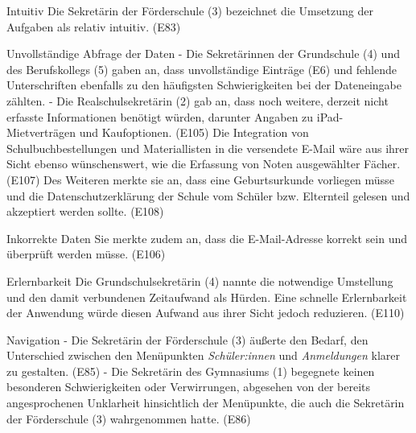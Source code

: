 Intuitiv
Die Sekretärin der Förderschule (3) bezeichnet die Umsetzung der Aufgaben als \glqq relativ intuitiv\grqq{}. (E83)

Unvollständige Abfrage der Daten
- Die Sekretärinnen der Grundschule (4) und des Berufskollegs (5) gaben an, dass unvollständige Einträge (E6) und fehlende Unterschriften ebenfalls zu den häufigsten Schwierigkeiten bei der Dateneingabe zählten.
- Die Realschulsekretärin (2) gab an, dass noch weitere, derzeit nicht erfasste Informationen benötigt würden, darunter Angaben zu iPad-Mietverträgen und Kaufoptionen. (E105)  Die Integration von Schulbuchbestellungen und Materiallisten in die versendete E-Mail wäre aus ihrer Sicht ebenso wünschenswert, wie die Erfassung von Noten ausgewählter Fächer. (E107) Des Weiteren merkte sie an, dass eine Geburtsurkunde vorliegen müsse und die Datenschutzerklärung der Schule vom Schüler bzw. Elternteil gelesen und akzeptiert werden sollte. (E108)

Inkorrekte Daten
Sie merkte zudem an, dass die E-Mail-Adresse korrekt sein und überprüft werden müsse. (E106)

Erlernbarkeit 
Die Grundschulsekretärin (4) nannte die notwendige Umstellung und den damit verbundenen Zeitaufwand als Hürden. Eine schnelle Erlernbarkeit der Anwendung würde diesen Aufwand aus ihrer Sicht jedoch reduzieren. (E110)

Navigation
- Die Sekretärin der Förderschule (3) äußerte den Bedarf, den Unterschied zwischen den Menüpunkten \textit{Schüler:innen} und \textit{Anmeldungen} klarer zu gestalten. (E85)
- Die Sekretärin des Gymnasiums (1) begegnete keinen besonderen Schwierigkeiten oder Verwirrungen, abgesehen von der bereits angesprochenen Unklarheit hinsichtlich der Menüpunkte, die auch die Sekretärin der Förderschule (3) wahrgenommen hatte. (E86)

